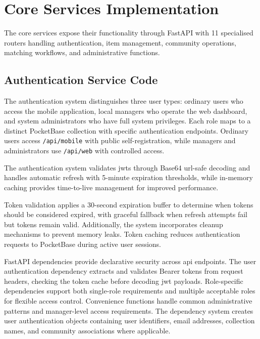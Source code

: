 \section{Core Services Implementation} \label{section:core_services}

The core services expose their functionality through FastAPI with 11 specialised routers handling authentication, item management, community operations, matching workflows, and administrative functions.


\subsection{Authentication Service Code} \label{subsection:auth_service}

The authentication system distinguishes three user types: ordinary users who access the mobile application, local managers who operate the web dashboard, and system administrators who have full system privileges. Each role maps to a distinct PocketBase collection with specific authentication endpoints. Ordinary users access \texttt{/api/mobile} with public self-registration, while managers and administrators use \texttt{/api/web} with controlled access.

The authentication system validates \acp{jwt} through Base64 \acs{url}-safe decoding and handles automatic refresh with 5-minute expiration thresholds, while in-memory caching provides time-to-live management for improved performance.

Token validation applies a 30-second expiration buffer to determine when tokens should be considered expired, with graceful fallback when refresh attempts fail but tokens remain valid. Additionally, the system incorporates cleanup mechanisms to prevent memory leaks. Token caching reduces authentication requests to PocketBase during active user sessions.

FastAPI dependencies provide declarative security across \ac{api} endpoints. The user authentication dependency extracts and validates Bearer tokens from request headers, checking the token cache before decoding \ac{jwt} payloads. Role-specific dependencies support both single-role requirements and multiple acceptable roles for flexible access control. Convenience functions handle common administrative patterns and manager-level access requirements. The dependency system creates user authentication objects containing user identifiers, email addresses, collection names, and community associations where applicable.

